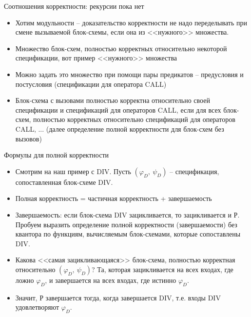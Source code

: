 \documentclass[hyperref={unicode=true}]{beamer}
\begin{document}
    \begin{frame}{Соотношения корректности: рекурсии пока нет}
    \begin{itemize}
    \item Хотим модульности -- доказательство корректности не надо
    переделывать при смене вызываемой блок-схемы, если она из
    <<нужного>> множества.
    \item Множество блок-схем, полностью корректных относительно
          некоторой спецификации, вот пример <<нужного>> множества
    \item Можно задать это множество при помощи пары предикатов --
            предусловия и постусловия (спецификации для оператора CALL)
    \item Блок-схема с вызовами полностью корректна относительно
            своей спецификации и спецификаций для операторов CALL, если
            для всех блок-схем, полностью корректных относительно
            спецификаций для операторов CALL, ... (далее определение полной
                    корректности для блок-схем без вызовов)
    \end{itemize}
    \end{frame}

    \begin{frame}{Формулы для полной корректности}
    \begin{itemize}
    \item Смотрим на наш пример с DIV. Пусть $(\varphi_D,~\psi_D)$ --
        спецификация, сопоставленная блок-схеме DIV.
    \item Полная корректность = частичная корректность + завершаемость
    \item Завершаемость: если блок-схема DIV зацикливается,
                то зацикливается и Р. Пробуем выразить определение
                полной корректности (завершаемости) без квантора по
                функциям, вычисляемым блок-схемами, которые сопоставлены DIV.
    \item Какова <<самая зацикливающаяся>> блок-схема, полностью
            корректная относительно $(\varphi_D,~\psi_D)$? Та, которая
            зацикливается на всех входах, где ложно $\varphi_D$, и
            завершается на всех входах, где истинно $\varphi_D$.
    \item Значит, Р завершается тогда, когда завершается DIV, т.е.
            входы DIV удовлетворяют $\varphi_D$.
    \end{itemize}
    \end{frame}
\end{document}
